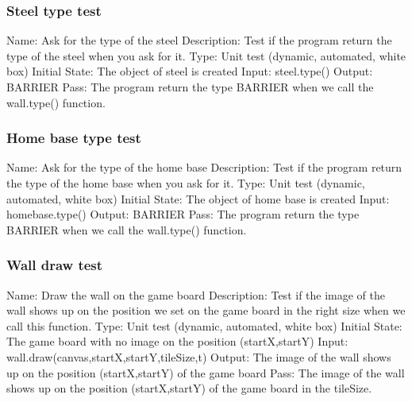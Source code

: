 \documentclass{article}
\begin{document}
\subsubsection{Steel type test}
Name:  Ask for the type of the steel\newline
Description: Test if the program return the type of the steel when you ask for 
it. \newline
Type: Unit test (dynamic, automated, white box) \newline
Initial State:  The object of steel is created \newline
Input: steel.type()\newline
Output: BARRIER\newline
Pass:  The program return the type BARRIER when we call the wall.type() 
function. \newline

\subsubsection{Home base type test}
Name:  Ask for the type of the home base\newline
Description: Test if the program return the type of the home base when you ask
 for it. \newline
Type: Unit test (dynamic, automated, white box) \newline
Initial State:  The object of home base is created \newline
Input: homebase.type()\newline
Output: BARRIER\newline
Pass:  The program return the type BARRIER when we call the wall.type() 
function. \newline

\subsubsection{Wall draw test}
Name:  Draw the wall on the game board\newline
Description: Test if the image of the wall shows up on the position we set on
 the game board in the right size when we call this function. \newline
Type: Unit test (dynamic, automated, white box) \newline
Initial State:  The game board with no image on the position (startX,startY) 
\newline
Input: wall.draw(canvas,startX,startY,tileSize,t)\newline
Output: The image of the wall shows up on the position (startX,startY) of the 
game board\newline
Pass:  The image of the wall shows up on the position (startX,startY) of the 
game board in the tileSize. \newline
\end{document}
